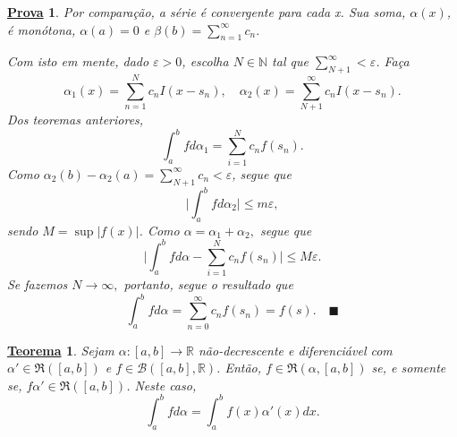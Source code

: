 \documentclass{article}
\newtheorem*{theorem*}{\underline{Teorema}}
\newtheorem*{proof*}{\underline{Prova}}
\renewcommand\qedsymbol{$\blacksquare$}
\begin{document}
\begin{proof*}
  Por comparação, a série é convergente para cada x. Sua soma, \(\alpha (x)\), é monótona, \(\alpha (a) = 0\) e \(\beta (b) = \sum\limits_{n=1}^{\infty}c_{n}.\)

  Com isto em mente, dado \(\varepsilon > 0\), escolha \(N\in \mathbb{N}\) tal que \(\sum\limits_{N+1}^{\infty} < \varepsilon \). Faça 
    \[
      \alpha _1(x) = \sum\limits_{n=1}^{N}c_{n}I(x-s_{n}),\quad \alpha _2(x) = \sum\limits_{N+1}^{\infty}c_{n}I(x-s_{n}).
    \]
  Dos teoremas anteriores, 
    \[
      \int_{a}^{b}fd\alpha_1 = \sum\limits_{i=1}^{N}c_{n}f(s_{n}).
    \]
  Como \(\alpha _2(b) - \alpha _2(a) = \sum\limits_{N+1}^{\infty}c_{n} < \varepsilon \), segue que 
    \[
      \biggl\vert \int_{a}^{b}f d\alpha_2 \biggr\vert \leq m\varepsilon ,
    \]
  sendo \(M = \sup{|f(x)|}\). Como \(\alpha = \alpha _1 + \alpha _2, \) segue que 
    \[
      \biggl\vert \int_{a}^{b}fd\alpha  - \sum\limits_{i=1}^{N}c_{n}f(s_{n}) \biggr\vert\leq M\varepsilon .
    \] 
  Se fazemos \(N\to \infty,\) portanto, segue o resultado que 
    \[
      \int_{a}^{b}f d\alpha = \sum\limits_{n=0}^{\infty}c_{n}f(s_{n}) = f(s).\quad \text{\qedsymbol}
    \]
\end{proof*}
\begin{theorem*}
  Sejam \(\alpha :[a, b]\rightarrow \mathbb{R}\) não-decrescente e diferenciável com \(\alpha '\in \mathfrak{R}([a, b])\) e \(f\in \mathcal{B}([a, b], \mathbb{R})\). Então, \(f\in \mathfrak{R}(\alpha , [a, b])\) se, e somente se, 
 \(f\alpha '\in \mathfrak{R}([a, b])\). Neste caso, 
   \[
     \int_{a}^{b}fd\alpha = \int_{a}^{b}f(x)\alpha'(x) dx. 
   \]
\end{theorem*}
\end{document}
